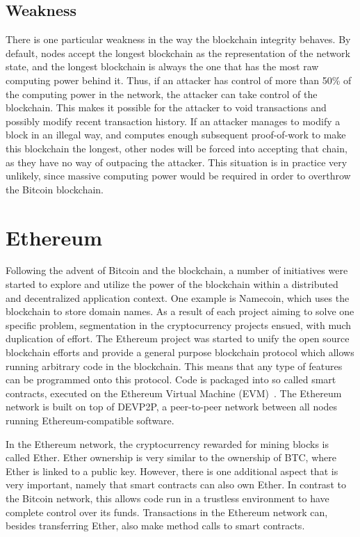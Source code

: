 \subsection{Weakness}
There is one particular weakness in the way the blockchain integrity behaves. By default, nodes accept the longest blockchain as the representation of the network state, and the longest blockchain is always the one that has the most raw computing power behind it. Thus, if an attacker has control of more than 50\% of the computing power in the network, the attacker can take control of the blockchain. This makes it possible for the attacker to void transactions and possibly modify recent transaction history. If an attacker manages to modify a block in an illegal way, and computes enough subsequent proof-of-work to make this blockchain the longest, other nodes will be forced into accepting that chain, as they have no way of outpacing the attacker. This situation is in practice very unlikely, since massive computing power would be required in order to overthrow the Bitcoin blockchain.

\section{Ethereum}
Following the advent of Bitcoin and the blockchain, a number of initiatives were started to explore and utilize the power of the blockchain within a distributed and decentralized application context. One example is Namecoin, which uses the blockchain to store domain names. As a result of each project aiming to solve one specific problem, segmentation in the cryptocurrency projects ensued, with much duplication of effort. The Ethereum project was started to unify the open source blockchain efforts and provide a general purpose blockchain protocol which allows running arbitrary code in the blockchain. This means that any type of features can be programmed onto this protocol. Code is packaged into so called smart contracts, executed on the Ethereum Virtual Machine (EVM)~\cite{ethereum:white}. The Ethereum network is built on top of DEVP2P, a peer-to-peer network between all nodes running Ethereum-compatible software.

In the Ethereum network, the cryptocurrency rewarded for mining blocks is called Ether. Ether ownership is very similar to the ownership of BTC, where Ether is linked to a public key. However, there is one additional aspect that is very important, namely that smart contracts can also own Ether. In contrast to the Bitcoin network, this allows code run in a trustless environment to have complete control over its funds. Transactions in the Ethereum network can, besides transferring Ether, also make method calls to smart contracts.

